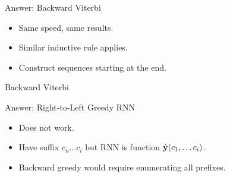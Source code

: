 \documentclass{beamer}
\def\Lattice{
    \matrix (network)
    [matrix of nodes,
    nodes in empty cells,
    ampersand replacement=\&,
    column sep={1cm},
    row sep={0.1cm},
    nodes={outer sep=0pt,circle,minimum size=0.5cm, minimum width=1.3cm,draw, rectangle} ]
    {
     O \& O \& O \& O \& O\\
     I-PER \& I-PER \& I-PER \& I-PER \& I-PER \\ 
     I-ORG \& I-ORG \& I-ORG \& I-ORG \& I-ORG \\ 
     I-LOC \& I-LOC \& I-LOC \& I-LOC \& I-LOC \\ 
     |[draw=none]| \\
     |[draw=none]| Mayor \& |[draw=none]| DeBlasio \& |[draw=none]| from \& |[draw=none]| New  \& |[draw=none]| York  \\  
};
}
\begin{document}
\begin{frame}{Answer: Backward Viterbi}
  \begin{itemize}
  \item Same speed, same results.
  \item Similar inductive rule applies.
  \item Construct sequences starting at the end. 
  \end{itemize}

  \begin{algorithmic}
    \EndFor{}
    \EndFor{}
    \EndProcedure{}
  \end{algorithmic}
\end{frame}

\begin{frame}{Backward Viterbi}
  \begin{center}
   
  \end{center}  
\end{frame}


\begin{frame}{Answer: Right-to-Left Greedy RNN }
  \begin{itemize}
  \item Does not work. 
    \air
  \item Have suffix $c_n \ldots c_i$ but RNN is function  $\hat{\mathbf{y}}(c_1, \ldots c_i)$.
    \air 
  \item Backward greedy would require enumerating all prefixes. 
  \end{itemize}
\end{frame}
\end{document}
